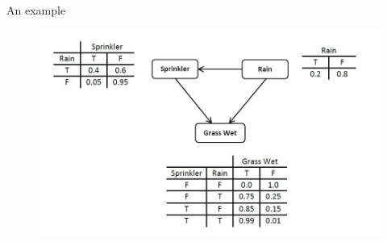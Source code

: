 \begin{frame}{An example}
\begin{figure}
\centering
\includegraphics[scale=0.4]{imgs/bnexample}
\end{figure}
\end{frame}
